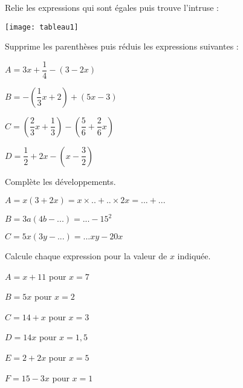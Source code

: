 \begin{exercice}
Relie les expressions qui sont égales puis trouve l'intruse :

\begin{center}
    \texttt{[image: tableau1]}
\end{center}
\end{exercice}



\begin{exercice}
Supprime les parenthèses puis réduis les expressions suivantes :
\begin{colenumerate}{1}
\item $A = 3x + \dfrac{1}{4} - (3-2x)$
\item $B =-(\dfrac{1}{3}x + 2) + (5x-3)$ 
\item $C =(\dfrac{2}{3}x + \dfrac{1}{3}) - (\dfrac{5}{6}+\dfrac{2}{6}x)$
\item $D = \dfrac{1}{2} + 2x -(x-\dfrac{3}{2})$
\end{colenumerate}
\end{exercice}


\begin{exercice}
Complète les développements.
\begin{colenumerate}{1}
\item $A = x(3 + 2x) = x \times .. + .. \times 2x = ... + ...$
\item $B = 3a(4b -...) = ... -15^2$
\item $C = 5x(3y -...) = ... xy -20x$
\end{colenumerate}
\end{exercice}








\begin{exercice}[] Calcule chaque expression pour la valeur de $x$ indiquée.
\begin{colenumerate}{2}
\item $A = x + 11$	pour $x = 7$
\item $B = 5x$	pour $x = 2$
\item $C = 14 + x$	pour $x = 3$
\item $D = 14x$	pour $x = 1,5$
\item $E = 2 + 2x$	pour $x = 5$
\item $F = 15 - 3x$	pour $x = 1$
\end{colenumerate}
\end{exercice}

